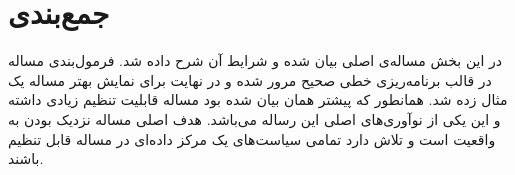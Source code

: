 \section{جمع‌بندی}

در این بخش مساله‌ی اصلی بیان شده و شرایط آن شرح داده شد.
فرمول‌بندی مساله در قالب برنامه‌ریزی خطی صحیح مرور شده و در نهایت برای نمایش بهتر مساله یک مثال زده شد.
همانطور که پیشتر همان بیان شده بود مساله قابلیت تنظیم زیادی داشته و این یکی از نوآوری‌های اصلی این رساله می‌باشد.
هدف اصلی مساله نزدیک بودن به واقعیت است و تلاش دارد تمامی سیاست‌های یک مرکز داده‌ای در مساله قابل تنظیم باشند.